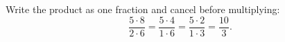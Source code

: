 Write the product as one fraction and cancel before multiplying:
\[\dfrac{5\cdot8}{2\cdot6}=\dfrac{5\cdot4}{1\cdot6}=\dfrac{5\cdot2}{1\cdot3}=\boxed{\dfrac{10}{3}}.\]
